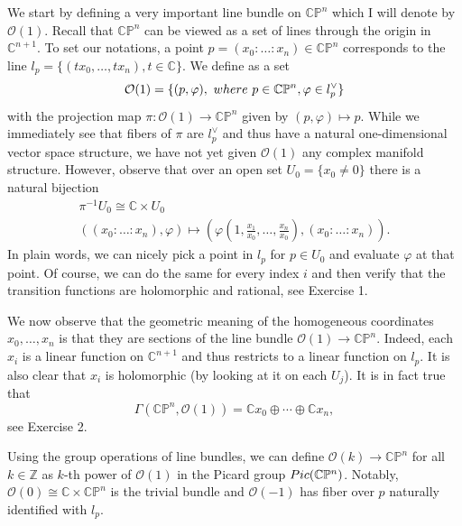 \documentclass[11pt]{article}
\numberwithin{equation}{section}
\numberwithin{footnote}{section}
\newcommand{\blue}{\color{blue}}
\renewcommand{\P}{{\mathbb P}}
\newcommand{\Z}{{\mathbb Z}}
\newcommand{\C}{{\mathbb C}}
\begin{document}
\smallskip
We start by defining a very important line bundle on $\C\P^n$ which I will denote by $\mathcal O(1)$. Recall that $\C\P^n$ can be viewed as a set of lines through the origin in $\C^{n+1}$. To set our notations, a point $p=(x_0:\ldots:x_n)\in \C\P^n$ corresponds to the line 
$l_p=\{(tx_0,\ldots,tx_n),t\in\C\}$. We define {\blue as a set}
$$
\mathcal O(1) =\{(p,\varphi),~{\rm where~}p\in \C\P^n, \varphi \in l_p^\vee\}
$$
with the projection map  $\pi:\mathcal O(1)\to\C\P^n$ given by $(p,\varphi)\mapsto p$. While we immediately see that fibers of  $\pi$ are $l_p^\vee$ and thus have a natural one-dimensional vector space structure, we have not yet given $\mathcal O(1)$ any complex manifold 
structure. However, observe that over an open set $U_0=\{x_0\neq 0\}$ there is a natural bijection
\begin{equation}\label{O1}
\begin{array}{c}\pi^{-1}U_0 \cong \C\times U_0\\[.2em]
((x_0:\ldots:x_n),\varphi) \mapsto (\varphi(1,\frac {x_1}{x_0},\ldots,\frac {x_n}{x_0}),(x_0:\ldots:x_n)).
\end{array}
\end{equation}
In plain words, we can nicely pick a point in $l_p$ for $p\in U_0$ and evaluate $\varphi$ at that point. Of course, we can do the same for every index $i$ and then verify that the transition functions are holomorphic and rational, see Exercise 1.


\smallskip
We now observe that the geometric meaning of the homogeneous coordinates $x_0,\ldots, x_n$ is that they are sections of the line bundle $\mathcal O(1)\to \C\P^n$. Indeed, each $x_i$ is a linear function on $\C^{n+1}$ and thus restricts to a linear function on $l_p$. It is also clear that $x_i$ is  holomorphic (by looking at it on each $U_j$). 
It is in fact true that 
$$\Gamma(\C\P^n, \mathcal O(1)) = \C x_0\oplus\cdots\oplus\C x_n,$$
see Exercise 2.


\smallskip
Using the group operations of line bundles, we can define $\mathcal O(k)\to\C\P^n$ for all $k\in \Z$ as $k$-th power of $\mathcal O(1)$ in the Picard group ${\rm Pic}(\C\P^n)$. Notably, $\mathcal O(0)\cong \C\times \C\P^n$ is the trivial bundle and $\mathcal O(-1)$ has fiber over $p$ naturally identified with $l_p$.
\end{document}
